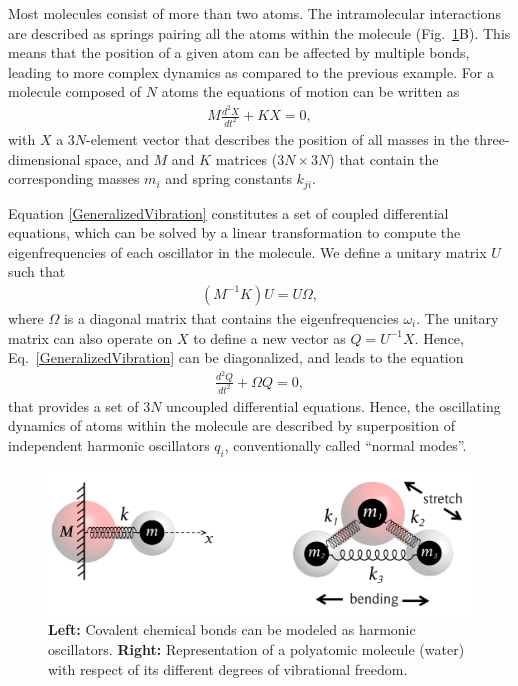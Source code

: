 Most molecules consist of more than two atoms. The intramolecular interactions are described as springs pairing all the atoms within the molecule (Fig.\ \ref{OscillatorsGen1}B). This means that the position of a given atom can be affected by multiple bonds, leading to more complex dynamics as compared to the previous example. For a molecule composed of $N$ atoms the equations of motion can be written as
\begin{eqnarray}
M \frac{d^2 X}{d t^2} +  K X = 0,
\label{GeneralizedVibration}
\end{eqnarray}
with $X$ a $3N$-element vector that describes the position of all masses in the three-dimensional space, and $M$ and $K$ matrices ($3N \times 3N$) that contain the corresponding masses $m_i$ and spring constants $k_{ji}$. 

Equation \ref{GeneralizedVibration} constitutes a set of coupled differential equations, which can be solved by a linear transformation to compute the eigenfrequencies of each oscillator in the molecule. We define a unitary matrix $U$ such that
\begin{eqnarray}
(M^{-1} K) U = U \Omega,
\label{EigenFunction1}
\end{eqnarray}
where $\Omega$ is a diagonal matrix that contains the eigenfrequencies $\omega_i$. The unitary matrix can also operate on $X$ to define a new vector as $Q = U^{-1} X$. Hence, Eq.\ \ref{GeneralizedVibration} can be diagonalized, and leads to the equation
\begin{eqnarray}
\frac{d^2 Q}{d t^2} +  \Omega Q = 0,
\label{Diagonalsolution}
\end{eqnarray}
that provides a set of $3N$ uncoupled differential equations. Hence, the oscillating dynamics of atoms within the molecule are described by superposition of independent harmonic oscillators $q_i$, conventionally called ``normal modes''.



\begin{figure}[t!]
	\centering
	\includegraphics[width=0.85\figwidth]{chapters/Chapter3_Methods2/Graphs/Oscillators.png} %
	\caption{\textbf{Left:} Covalent chemical bonds can be modeled as harmonic oscillators. \textbf{Right:} Representation of a polyatomic molecule (water) with respect of its different degrees of vibrational freedom.}
	\label{OscillatorsGen1}
\end{figure}




